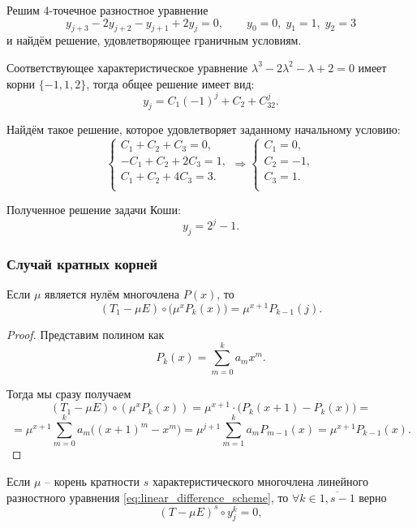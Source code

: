 \documentclass[../main.tex]{subfile}
\begin{document}
\begin{example}
	Решим 4-точечное разностное уравнение
	\[y_{j+3}-2y_{j+2}-y_{j+1}+2y_j=0,\qquad y_0=0,\;y_1=1,\;y_2=3\]
	и найдём решение, удовлетворяющее граничным условиям.

	Соответствующее характеристическое уравнение $\lambda^3-2\lambda^2-
	\lambda+2=0$ имеет корни $\{-1,1,2\}$, тогда общее решение имеет вид:
	\[y_j=C_1(-1)^j+C_2+C_32^j.\]

	Найдём такое решение, которое удовлетворяет заданному начальному
	условию:
	\[
		\begin{cases}
			C_1+C_2+C_3=0, \\
			-C_1+C_2+2C_3=1, \\
			C_1+C_2+4C_3=3. \\
		\end{cases}
		\Rightarrow
		\begin{cases}
			C_1=0, \\
			C_2=-1, \\
			C_3=1. \\
		\end{cases}
	\]

	Полученное решение задачи Коши:
	\[y_j=2^j-1.\]
\end{example}

\subsubsection{Случай кратных корней}
\begin{lemma}\label{eq:polynomial_power_lowering}
	Если $\mu$ является нулём многочлена $P(x)$, то
	\[(T_1-\mu E)\circ\big(\mu^xP_k(x)\big)=\mu^{x+1}P_{k-1}(j).\]
\end{lemma}

\begin{proof}
	Представим полином как
	\[P_k(x)=\sum_{m=0}^{k}a_mx^m.\]

	Тогда мы сразу получаем
	\[(T_1-\mu E)\circ(\mu^xP_k(x))=\mu^{x+1}\cdot\big(P_k(x+1)-P_k(x)
	\big)=\]
	\[=\mu^{x+1}\sum_{m=0}^{k}a_m\big((x+1)^m-x^m\big)=\mu^{j+1}\sum_{m=1}^
	{k}a_mP_{m-1}(x)=\mu^{x+1}P_{k-1}(x).\]
\end{proof}

\begin{lemma}\label{eq:characteristic_nullicifation}
	Если $\mu$ -- корень кратности $s$ характеристического многочлена
	линейного разностного уравнения \eqref{eq:linear_difference_scheme},
	то $\forall k\in\overline{1,s-1}$ верно
	\[(T-\mu E)^s\circ y_j^k=0,\]
\end{lemma}
\end{document}
